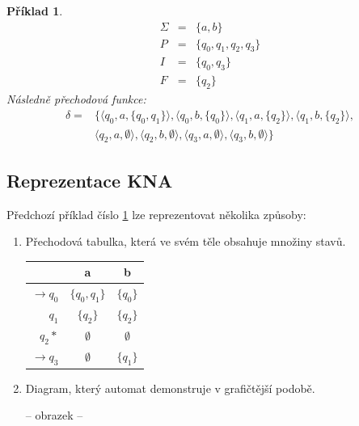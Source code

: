 \documentclass[10pt, a4paper, titlepage]{article}
\theoremstyle{note}
\newtheorem{priklad}{\textbf{Příklad}}
\begin{document}
\begin{priklad}\label{priklad-3}
\begin{eqnarray*}
\Sigma &=& \lbrace a, b \rbrace \\
P &=& \lbrace q_{0}, q_{1}, q_{2}, q_{3} \rbrace \\
I &=& \lbrace q_{0}, q_{3} \rbrace \\
F &=& \lbrace q_{2} \rbrace 
\end{eqnarray*}
Následně přechodová funkce:
\begin{eqnarray*}
\delta =&
\lbrace
\langle q_{0}, a, \lbrace q_{0},q_{1} \rbrace \rangle,
\langle q_{0}, b, \lbrace q_{0} \rbrace \rangle,
\langle q_{1}, a, \lbrace q_{2} \rbrace \rangle,
\langle q_{1}, b, \lbrace q_{2} \rbrace \rangle, \\
& \langle q_{2}, a, \emptyset \rangle,
\langle q_{2}, b, \emptyset \rangle,
\langle q_{3}, a, \emptyset \rangle,
\langle q_{3}, b, \emptyset \rangle 
\rbrace
\end{eqnarray*}
\end{priklad}

\subsection{Reprezentace KNA}
Předchozí příklad číslo \ref{priklad-3} lze reprezentovat několika způsoby:
\begin{enumerate}
\item
Přechodová tabulka, která ve svém těle obsahuje množiny stavů.

\begin{center}
\begin{tabular}{ r || c | c }                   
   & a & b \\
   \hline
   $ \rightarrow q_{0} $ & $ \lbrace q_{0},q_{1} \rbrace $ & $ \lbrace q_{0} \rbrace $ \\
   $ q_{1} $ & $ \lbrace q_{2} \rbrace $ & $ \lbrace q_{2} \rbrace $ \\
   $ q_{2} * $ & $ \emptyset $ & $ \emptyset $ \\
   $ \rightarrow q_{3} $ & $ \emptyset $ & $ \lbrace q_{1} \rbrace $ \\ 
\end{tabular}
\end{center}

\item
Diagram, který automat demonstruje v grafičtější podobě.

-- obrazek --

\end{enumerate}
\end{document}
